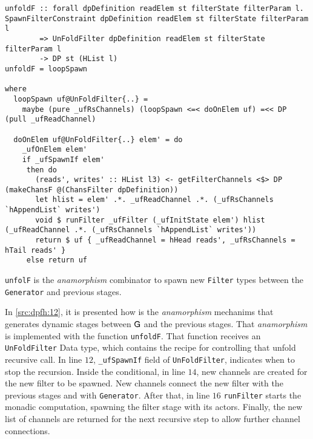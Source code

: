 \begin{listing}[H]
  \begin{verbatim}
unfoldF :: forall dpDefinition readElem st filterState filterParam l. SpawnFilterConstraint dpDefinition readElem st filterState filterParam l
        => UnFoldFilter dpDefinition readElem st filterState filterParam l 
        -> DP st (HList l) 
unfoldF = loopSpawn

where
  loopSpawn uf@UnFoldFilter{..} =
    maybe (pure _ufRsChannels) (loopSpawn <=< doOnElem uf) =<< DP (pull _ufReadChannel)

  doOnElem uf@UnFoldFilter{..} elem' = do
    _ufOnElem elem'
    if _ufSpawnIf elem'
     then do
       (reads', writes' :: HList l3) <- getFilterChannels <$> DP (makeChansF @(ChansFilter dpDefinition))
       let hlist = elem' .*. _ufReadChannel .*. (_ufRsChannels `hAppendList` writes')
       void $ runFilter _ufFilter (_ufInitState elem') hlist (_ufReadChannel .*. (_ufRsChannels `hAppendList` writes'))
       return $ uf { _ufReadChannel = hHead reads', _ufRsChannels = hTail reads' }
     else return uf

  \end{verbatim}
  \caption[{[\texttt{Stage.hs}] unfoldF}]{\texttt{unfolF} is the \emph{anamorphism} combinator to spawn new \texttt{Filter} types between the \texttt{Generator} and previous stages.}
  \label{src:dpfh:12}
\end{listing}

In \autoref{src:dpfh:12}, it is presented how is the \emph{anamorphism} mechanims that generates dynamic stages between $\mathsf{G}$ and the previous stages.
That \emph{anamorphism} is implemented with the function \texttt{unfoldF}. That function receives an \texttt{UnFoldFilter} Data type, which contains the recipe for controlling that unfold recursive call. 
In line $12$, \texttt{_ufSpawnIf} field of \texttt{UnFoldFilter}, indicates when to stop the recursion. 
Inside the conditional, in line $14$, new channels are created for the new filter to be spawned. New channels connect the new filter with the previous stages and with \texttt{Generator}. 
After that, in line $16$ \texttt{runFilter} starts the monadic computation, spawning the filter stage with its actors.
Finally, the new list of channels are returned for the next recursive step to allow further channel connections.

